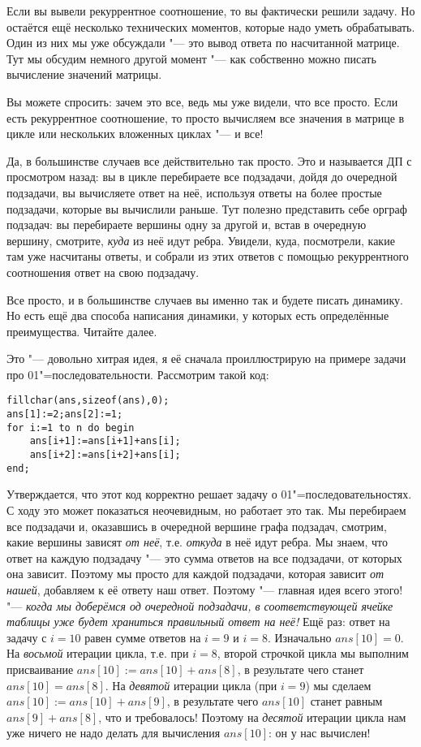 Если вы вывели рекуррентное соотношение, то вы фактически решили задачу. Но остаётся ещё несколько
технических моментов, которые надо уметь обрабатывать. Один из них мы уже обсуждали "--- это вывод
ответа по насчитанной матрице. Тут мы обсудим немного другой момент "--- как собственно можно писать
вычисление значений матрицы.

Вы можете спросить: зачем это все, ведь мы уже видели, что все просто. Если есть рекуррентное
соотношение, то просто вычисляем все значения в матрице в цикле или нескольких вложенных циклах "---
и все!

Да, в большинстве случаев все действительно так просто. Это и называется ДП с просмотром назад: вы в цикле перебираете все подзадачи, дойдя до очередной подзадачи, вы вычисляете ответ на неё, используя ответы на более простые подзадачи, которые вы вычислили раньше. Тут полезно представить себе орграф подзадач: вы перебираете вершины одну за другой и, встав в очередную вершину, смотрите, \textit{куда} из неё идут ребра. Увидели, куда, посмотрели, какие там уже насчитаны ответы, и собрали из этих ответов с помощью рекуррентного соотношения ответ на свою подзадачу.

Все просто, и в большинстве случаев вы именно так и будете писать динамику. Но есть ещё два способа написания динамики, у которых есть определённые преимущества. Читайте далее.

  Это "--- довольно хитрая идея, я её сначала проиллюстрирую на примере задачи про 01"=последовательности. Рассмотрим такой код:
\begin{codesampleo}\begin{verbatim}
fillchar(ans,sizeof(ans),0);
ans[1]:=2;ans[2]:=1;
for i:=1 to n do begin
    ans[i+1]:=ans[i+1]+ans[i];
    ans[i+2]:=ans[i+2]+ans[i];
end;
\end{verbatim}\end{codesampleo}
Утверждается, что этот код корректно решает задачу о 01"=последовательностях. С ходу это может показаться неочевидным, но работает это так. Мы перебираем все подзадачи и, оказавшись в очередной вершине графа подзадач, смотрим, какие вершины зависят \textit{от неё}, т.е. \textit{откуда} в неё идут ребра. Мы знаем, что ответ на каждую подзадачу "--- это сумма ответов на все подзадачи, от которых она зависит. Поэтому мы просто для каждой подзадачи, которая зависит \textit{от нашей}, добавляем к её ответу наш ответ. Поэтому "--- главная идея всего этого! "--- \textit{когда мы доберёмся од очередной подзадачи, в соответствующей ячейке таблицы уже будет храниться правильный ответ на неё!} Ещё раз: ответ на задачу с $i=10$ равен сумме ответов на $i=9$ и $i=8$. Изначально $ans[10]=0$. На \textit{восьмой} итерации цикла, т.е. при $i=8$, второй строчкой цикла мы выполним присваивание $ans[10]:=ans[10]+ans[8]$, в результате чего станет $ans[10]=ans[8]$. На \textit{девятой} итерации цикла (при $i=9$) мы сделаем $ans[10]:=ans[10]+ans[9]$, в результате чего $ans[10]$ станет равным $ans[9]+ans[8]$, что и требовалось! Поэтому на \textit{десятой} итерации цикла нам уже ничего не надо делать для вычисления $ans[10]$: он у нас вычислен!

